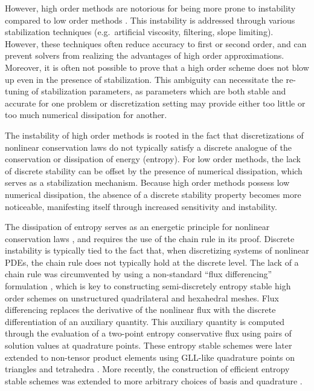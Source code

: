 \documentclass[review,onefignum,onetabnum,final]{siamart171218}
\begin{document}
However, high order methods are notorious for being more prone to instability compared to low order methods \cite{wang2013high}.  This instability is addressed through various stabilization techniques (e.g.\ artificial viscosity, filtering, slope limiting).  However, these techniques often reduce accuracy to first or second order, and can prevent solvers from realizing the advantages of high order approximations.  Moreover, it is often not possible to prove that a high order scheme does not blow up even in the presence of stabilization.  This ambiguity can necessitate the re-tuning of stabilization parameters, as parameters which are both stable and accurate for one problem or discretization setting  may provide either too little or too much numerical dissipation for another.  

The instability of high order methods is rooted in the fact that discretizations of nonlinear conservation laws do not typically satisfy a discrete analogue of the conservation or dissipation of energy (entropy).  For low order methods, the lack of discrete stability can be offset by the presence of numerical dissipation, which serves as a stabilization mechanism.  Because high order methods possess low numerical dissipation, the absence of a discrete stability property becomes more noticeable, manifesting itself through increased sensitivity and instability.  

The dissipation of entropy serves as an energetic principle for nonlinear conservation laws \cite{dafermos2005compensated}, and requires the use of the chain rule in its proof.  Discrete instability is typically tied to the fact that, when discretizing systems of nonlinear PDEs, the chain rule does not typically hold at the discrete level.  The lack of a chain rule was circumvented by using a non-standard ``flux differencing'' formulation \cite{fisher2013high, carpenter2014entropy, gassner2016split, gassner2017br1}, which is key to constructing semi-discretely entropy stable high order schemes on unstructured quadrilateral and hexahedral meshes.  Flux differencing replaces the derivative of the nonlinear flux with the discrete differentiation of an auxiliary quantity.  This auxiliary quantity is computed through the evaluation of a two-point entropy conservative flux \cite{tadmor1987numerical} using pairs of solution values at quadrature points.  These entropy stable schemes were later extended to non-tensor product elements using GLL-like quadrature points on triangles and tetrahedra \cite{chen2017entropy, crean2018entropy}.  More recently, the construction of efficient entropy stable schemes was extended to more arbitrary choices of basis and quadrature \cite{chan2017discretely, chan2018discretely}.  
\end{document}
